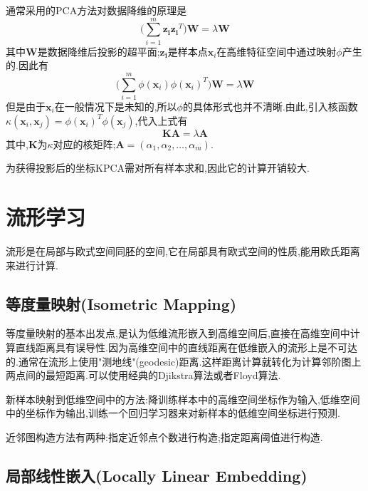 通常采用的PCA方法对数据降维的原理是
\begin{equation}
\Big(\sum_{i=1}^m\mathbf{z_iz_i}^T\Big)\mathbf{W}=\lambda\mathbf{W}
\end{equation}
其中$\mathbf{W}$是数据降维后投影的超平面;$\mathbf{z_i}$是样本点$\mathbf{x}_i$在高维特征空间中通过映射$\phi$产生的.因此有
\begin{equation}
\Big(\sum_{i=1}^m\phi(\mathbf{x}_i)\phi(\mathbf{x}_i)^T\Big)\mathbf{W}=\lambda\mathbf{W}
\end{equation}
但是由于$\mathbf{x}_i$在一般情况下是未知的,所以$\phi$的具体形式也并不清晰.由此,引入核函数$\kappa(\mathbf{x}_i, \mathbf{x}_j)=\phi(\mathbf{x}_i)^T\phi(\mathbf{x}_j)$,代入上式有
\begin{equation}
\mathbf{KA}=\lambda\mathbf{A}
\end{equation}
其中,$\mathbf{K}$为$\kappa$对应的核矩阵;$\mathbf{A}=(\alpha_1, \alpha_2, \dots, \alpha_m)$.

为获得投影后的坐标KPCA需对所有样本求和,因此它的计算开销较大.

\section{流形学习}

流形是在局部与欧式空间同胚的空间,它在局部具有欧式空间的性质,能用欧氏距离来进行计算.

\subsection{等度量映射(Isometric Mapping)}

等度量映射的基本出发点,是认为低维流形嵌入到高维空间后,直接在高维空间中计算直线距离具有误导性.因为高维空间中的直线距离在低维嵌入的流形上是不可达的.通常在流形上使用"测地线"(geodesic)距离.这样距离计算就转化为计算邻阶图上两点间的最短距离.可以使用经典的Djikstra算法或者Floyd算法.

新样本映射到低维空间中的方法:降训练样本中的高维空间坐标作为输入,低维空间中的坐标作为输出,训练一个回归学习器来对新样本的低维空间坐标进行预测.

近邻图构造方法有两种:指定近邻点个数进行构造;指定距离阈值进行构造.

\subsection{局部线性嵌入(Locally Linear Embedding)}

